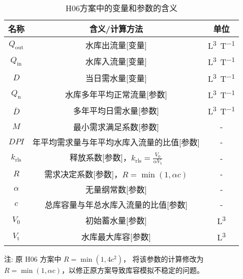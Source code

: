\begin{table}[htbp]
  \centering
  \caption{H06方案中的变量和参数的含义}
  \label{tab:H06方案变量参数表}
  \begin{threeparttable}
    \begin{tabular}{ccc}
      \toprule
      名称               & 含义/计算方法                                                            & 单位              \\ \midrule
      $Q_{\mathrm{out}}$ & 水库出流量[变量]                                                         & \unit{L^3.T^{-1}} \\
      $Q_{\mathrm{in}}$  & 水库入流量[变量]                                                         & \unit{L^3.T^{-1}} \\
      $D$                & 当日需水量[变量]                                                         & \unit{L^3.T^{-1}} \\
      $Q_{\mathrm {n}} $ & 水库多年平均正常流量[参数]                                               & \unit{L^3.T^{-1}} \\
      $\overline{D}$     & 多年平均日需水量[参数]                                                   & \unit{L^3.T^{-1}} \\
      $M$                & 最小需求满足系数[参数]                                                   & -                 \\
      $DPI$              & 年平均需求量与年平均水库入流量的比值[参数]                               & -                 \\
      $k_{\mathrm{rls}}$ & 释放系数[参数]，$k_{\mathrm{rls}} = \frac{V_0}{\alpha V_{\mathrm {t}} }$ & -                 \\
      $R$                & 需求决定系数[参数]，$R=\min(1, \alpha c)$                                & -                 \\
      $\alpha$           & 无量纲常数[参数]                                                         & -                 \\
      $c$                & 总库容量与年总水库入流量的比值[参数]                                     & -                 \\
      $V_0$              & 初始蓄水量[参数]                                                         & \unit{L^3}        \\
      $V_{\mathrm {t}} $ & 水库最大库容[参数]                                                       & \unit{L^3}        \\
      \bottomrule
    \end{tabular}
    \begin{tablenotes}
      \footnotesize
    \item[注:] 原 H06 方案中 $R=\min(1,4 c^2)$，\citet{Shin-etal_19} 将该参数的计算修改为 $R=\min(1,\alpha c)$，以修正原方案导致库容模拟不稳定的问题。
    \end{tablenotes}
  \end{threeparttable}
\end{table}

